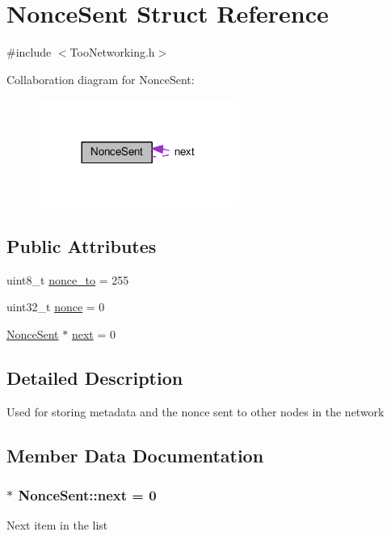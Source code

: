 \hypertarget{structNonceSent}{}\section{Nonce\+Sent Struct Reference}
\label{structNonceSent}


{\ttfamily \#include $<$Too\+Networking.\+h$>$}



Collaboration diagram for Nonce\+Sent\+:\nopagebreak
\begin{figure}[H]
\begin{center}
\leavevmode
\includegraphics[width=185pt]{structNonceSent__coll__graph}
\end{center}
\end{figure}
\subsection*{Public Attributes}
\begin{DoxyCompactItemize}
\item 
uint8\+\_\+t \hyperlink{structNonceSent_ad5484888a11a0c041610c38b564c5627}{nonce\+\_\+to} = 255
\item 
uint32\+\_\+t \hyperlink{structNonceSent_ae9d167a911c22c9d4490d2fee2093c10}{nonce} = 0
\item 
\hyperlink{structNonceSent}{Nonce\+Sent} $\ast$ \hyperlink{structNonceSent_a1c51c6d93e58ff1d94a0ab691c28fd24}{next} = 0
\end{DoxyCompactItemize}


\subsection{Detailed Description}
Used for storing metadata and the nonce sent to other nodes in the network 

\subsection{Member Data Documentation}
\subsubsection[{\texorpdfstring{next}{next}}]{$\ast$ Nonce\+Sent\+::next = 0}\hypertarget{structNonceSent_a1c51c6d93e58ff1d94a0ab691c28fd24}{}\label{structNonceSent_a1c51c6d93e58ff1d94a0ab691c28fd24}
Next item in the list 
